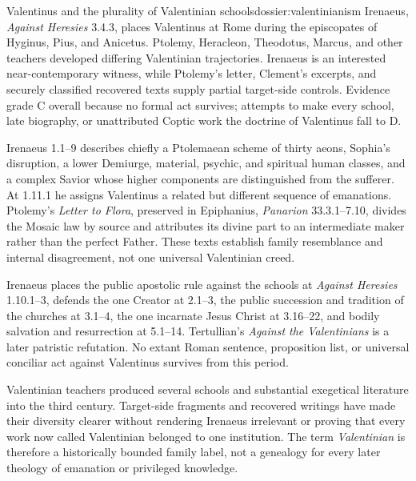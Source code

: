 \begin{heresydossier}{Valentinus and the plurality of Valentinian schools}{dossier:valentinianism}
\objectfield Irenaeus, \emph{Against Heresies} 3.4.3, places Valentinus at Rome during the episcopates of Hyginus, Pius, and Anicetus. Ptolemy, Heracleon, Theodotus, Marcus, and other teachers developed differing Valentinian trajectories. Irenaeus is an interested near-contemporary witness, while Ptolemy's letter, Clement's excerpts, and securely classified recovered texts supply partial target-side controls. Evidence grade C overall because no formal act survives; attempts to make every school, late biography, or unattributed Coptic work the doctrine of Valentinus fall to D.

\propositionfield Irenaeus 1.1--9 describes chiefly a Ptolemaean scheme of thirty aeons, Sophia's disruption, a lower Demiurge, material, psychic, and spiritual human classes, and a complex Savior whose higher components are distinguished from the sufferer. At 1.11.1 he assigns Valentinus a related but different sequence of emanations. Ptolemy's \emph{Letter to Flora}, preserved in Epiphanius, \emph{Panarion} 33.3.1--7.10, divides the Mosaic law by source and attributes its divine part to an intermediate maker rather than the perfect Father. These texts establish family resemblance and internal disagreement, not one universal Valentinian creed.

\responsefield Irenaeus places the public apostolic rule against the schools at \emph{Against Heresies} 1.10.1--3, defends the one Creator at 2.1--3, the public succession and tradition of the churches at 3.1--4, the one incarnate Jesus Christ at 3.16--22, and bodily salvation and resurrection at 5.1--14. Tertullian's \emph{Against the Valentinians} is a later patristic refutation. No extant Roman sentence, proposition list, or universal conciliar act against Valentinus survives from this period.

\aftermathfield Valentinian teachers produced several schools and substantial exegetical literature into the third century. Target-side fragments and recovered writings have made their diversity clearer without rendering Irenaeus irrelevant or proving that every work now called Valentinian belonged to one institution. The term \emph{Valentinian} is therefore a historically bounded family label, not a genealogy for every later theology of emanation or privileged knowledge.
\end{heresydossier}

